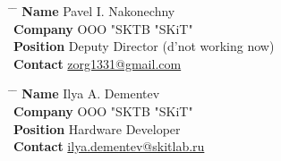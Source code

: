\parbox{0.5\textwidth}{ %
\begin{tabbing}
\hspace{2.75cm} \= \hspace{4cm} \= \kill %
{\bf Name} \> Pavel I. Nakonechny \\ %
{\bf Company} \> OOO "SKTB "SKiT" \\ %
{\bf Position} \> Deputy Director (d'not working now) \\ %
{\bf Contact} \> \href{mailto:zorg1331@gmail.com}{zorg1331@gmail.com} %
\end{tabbing}}
\hfill %
\parbox{0.5\textwidth}{ %
\begin{tabbing}
\hspace{2.75cm} \= \hspace{4cm} \= \kill %
{\bf Name} \> Ilya A. Dementev\\ %
{\bf Company} \> OOO "SKTB "SKiT" \\ %
{\bf Position} \> Hardware Developer \\ %
{\bf Contact} \> \href{mailto:ilya.dementev@skitlab.ru}{ilya.dementev@skitlab.ru} %
\end{tabbing}}


